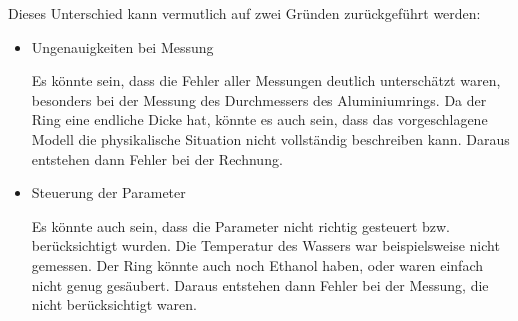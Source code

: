 		    Dieses Unterschied kann vermutlich auf zwei Gründen zurückgeführt werden:
		    \begin{itemize}
		    	\item Ungenauigkeiten bei Messung

		    	Es könnte sein, dass die Fehler aller Messungen deutlich unterschätzt waren, besonders bei der Messung des Durchmessers des Aluminiumrings. Da der Ring eine endliche Dicke hat, könnte es auch sein, dass das vorgeschlagene Modell die physikalische Situation nicht vollständig beschreiben kann. Daraus entstehen dann Fehler bei der Rechnung. 

		    	\item Steuerung der Parameter

		    	Es könnte auch sein, dass die Parameter nicht richtig gesteuert bzw. berücksichtigt wurden. Die Temperatur des Wassers war beispielsweise nicht gemessen. Der Ring könnte auch noch Ethanol haben, oder waren einfach nicht genug gesäubert. Daraus entstehen dann Fehler bei der Messung, die nicht berücksichtigt waren.
		    \end{itemize}